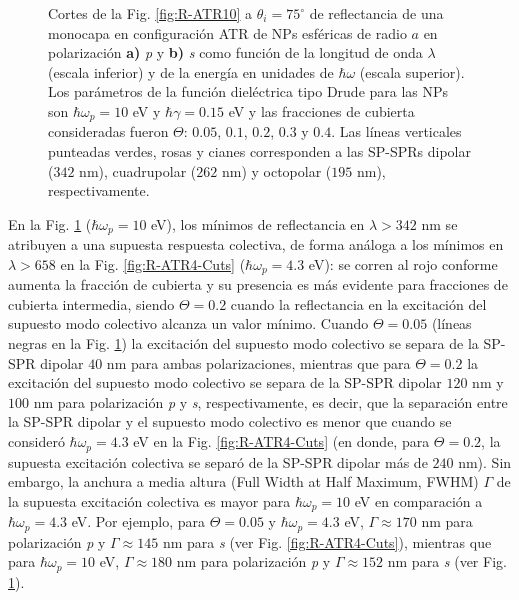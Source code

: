 \begin{figure}[h!]
	\caption{Cortes de la Fig. \ref{fig:R-ATR10} a $\theta_i = 75^\circ$ de reflectancia de una monocapa en configuración ATR de NPs esféricas de radio $a$ en polarización \textbf{a)} \emph{p} y \textbf{b)} \emph{s} como función de la longitud de onda $\lambda$ (escala inferior) y de la energía en unidades de $\hbar\omega$ (escala superior). Los parámetros de la función dieléctrica tipo Drude para las NPs son $\hbar\omega_p = 10$ eV y $\hbar\gamma = 0.15$ eV y las fracciones de cubierta consideradas fueron $\Theta$: $0. 05$, $0. 1$, $0. 2$, $0. 3$ y $0. 4$. Las líneas verticales punteadas verdes, rosas y cianes corresponden a las SP-SPRs dipolar ($342$ nm), cuadrupolar ($262$ nm) y octopolar ($195$ nm), respectivamente.  }\label{fig:R-ATR10-Cuts}
	\end{figure}	

En la Fig. \ref{fig:R-ATR10-Cuts} ($\hbar\omega_p=10$ eV), los mínimos de reflectancia en $\lambda > 342$ nm se atribuyen a una supuesta respuesta colectiva, de forma análoga a los mínimos en $\lambda>658$ en la Fig. \ref{fig:R-ATR4-Cuts} ($\hbar\omega_p = 4.3$ eV): se corren al rojo conforme aumenta la fracción de cubierta y su presencia es más evidente para fracciones de cubierta intermedia, siendo  $\Theta=0.2$ cuando la reflectancia en la excitación del supuesto modo colectivo alcanza un valor mínimo. Cuando $\Theta = 0.05$ (líneas negras en la Fig. \ref{fig:R-ATR10-Cuts}) la excitación del supuesto modo colectivo se separa de la SP-SPR dipolar   $40$ nm para ambas polarizaciones, mientras que para $\Theta = 0.2$ la excitación del supuesto modo colectivo se separa de la SP-SPR dipolar  $120$ nm y $100$ nm para polarización \emph{p} y \emph{s}, respectivamente, es decir, que la separación entre la SP-SPR dipolar y el supuesto modo colectivo es menor que cuando se consideró $\hbar\omega_p = 4.3$ eV en la Fig. \ref{fig:R-ATR4-Cuts} (en donde, para $\Theta=0.2$, la supuesta excitación colectiva se separó de la SP-SPR dipolar más de $240$ nm). Sin embargo, la anchura a media altura (Full Width at Half Maximum, FWHM) $\Gamma$ de la supuesta excitación colectiva es mayor para $\hbar\omega_p=10$ eV en comparación a $\hbar\omega_p=4.3$ eV. Por ejemplo, para $\Theta = 0.05$ y $\hbar\omega_p = 4.3$ eV,  $\Gamma\approx 170$ nm para polarización \emph{p} y  $\Gamma\approx 145$ nm para  \emph{s} (ver Fig. \ref{fig:R-ATR4-Cuts}), mientras que para  $\hbar\omega_p = 10$ eV,  $\Gamma\approx 180$ nm para polarización \emph{p} y  $\Gamma\approx 152$ nm para  \emph{s} (ver Fig. \ref{fig:R-ATR10-Cuts}).

